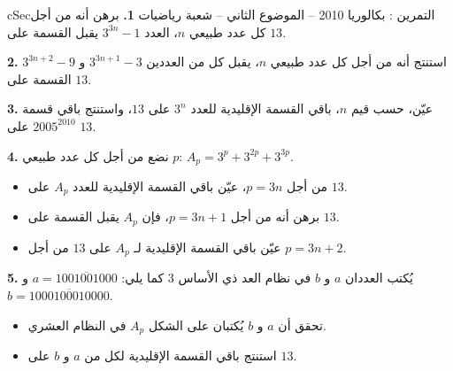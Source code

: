 \documentclass[12pt,a4paper]{article}
\newenvironment{BOX}[2]{\begin{otherlanguage}{english}\begin{arbox}{#1}{#2}}{\end{arbox}\end{otherlanguage}}
\newcounter{exo}
\newenvironment{tamrin}[1]{\stepcounter{exo}\begin{BOX}{cSec}{التمرين \theexo: #1}}{\end{BOX}}
\newenvironment{sq}{\begin{itemize}[leftmargin=2.4em,itemsep=3pt]}{\end{itemize}}
\newcommand{\qa}{\item[(أ)]}\newcommand{\qb}{\item[(ب)]}\newcommand{\qc}{\item[(جـ)]}\newcommand{\qd}{\item[(د)]}\newcommand{\qe}{\item[(هـ)]}
\begin{document}
\begin{tamrin}{بكالوريا 2010 -- الموضوع الثاني -- شعبة رياضيات}
\textbf{1.} برهن أنه من أجل كل عدد طبيعي $n$، العدد $3^{3n}-1$ يقبل القسمة على $13$.

\textbf{2.} استنتج أنه من أجل كل عدد طبيعي $n$، يقبل كل من العددين $3^{3n+1}-3$ و $3^{3n+2}-9$ القسمة على $13$.

\textbf{3.} عيّن، حسب قيم $n$، باقي القسمة الإقليدية للعدد $3^n$ على $13$، واستنتج باقي قسمة $2005^{2010}$ على $13$.

\textbf{4.} نضع من أجل كل عدد طبيعي $p$: $A_p=3^p+3^{2p}+3^{3p}$.
\begin{sq}
\qa من أجل $p=3n$، عيّن باقي القسمة الإقليدية للعدد $A_p$ على $13$.
\qb برهن أنه من أجل $p=3n+1$، فإن $A_p$ يقبل القسمة على $13$.
\qc عيّن باقي القسمة الإقليدية لـ $A_p$ على $13$ من أجل $p=3n+2$.
\end{sq}
\textbf{5.} يُكتب العددان $a$ و $b$ في نظام العد ذي الأساس $3$ كما يلي: $a=\overline{1001001000}$ و $b=\overline{1000100010000}$.
\begin{sq}
\qa تحقق أن $a$ و $b$ يُكتبان على الشكل $A_p$ في النظام العشري.
\qb استنتج باقي القسمة الإقليدية لكل من $a$ و $b$ على $13$.
\end{sq}
\end{tamrin}
\end{document}
